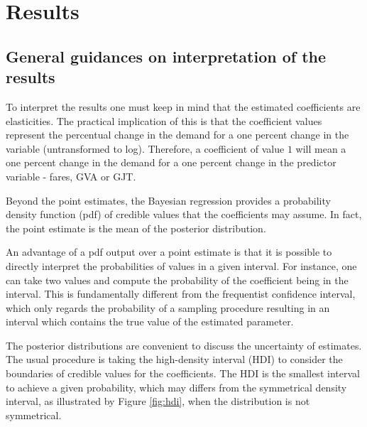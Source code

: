 \chapter{Results}
\label{chp:results}

\section{General guidances on interpretation of the results}

To interpret the results one must keep in mind that the estimated coefficients are elasticities. The practical implication of this is that the coefficient values represent the percentual change in the demand for a one percent change in the variable (untransformed to log). Therefore, a coefficient of value $1$ will mean a one percent change in the demand for a one percent change in the predictor variable - fares, GVA or GJT. 



Beyond the point estimates, the Bayesian regression provides a probability density function (pdf) of credible values that the coefficients may assume. In fact, the point estimate is the mean of the posterior distribution. 

An advantage of a pdf output over a point estimate is that it is possible to directly interpret the probabilities of values in a given interval. For instance, one can take two values and compute the probability of the coefficient being in the interval. This is fundamentally different from the frequentist confidence interval, which only regards the probability of a sampling procedure resulting in an interval which contains the true value of the estimated parameter.

The posterior distributions are convenient to discuss the uncertainty of estimates. The usual procedure is taking the high-density interval (HDI) to consider the boundaries of credible values for the coefficients. The HDI is the smallest interval to achieve a given probability, which may differs from the symmetrical density interval, as illustrated by Figure \ref{fig:hdi}, when the distribution is not symmetrical. 

